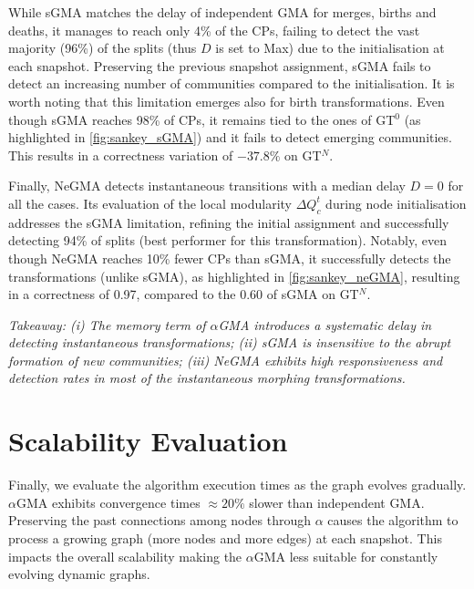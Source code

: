 \documentclass[letterpaper]{article}
\begin{document}
While sGMA matches the delay of independent GMA for merges, births and deaths, it manages to reach only 4\% of the CPs, failing to detect the vast majority (96\%) of the splits (thus $D$ is set to Max) due to the initialisation at each snapshot. Preserving the previous snapshot assignment, sGMA fails to detect an increasing number of communities compared to the initialisation.
It is worth noting that this limitation emerges also for birth transformations. Even though sGMA reaches 98\% of CPs, it remains tied to the ones of GT$^0$ (as highlighted in \cref{fig:sankey_sGMA}) and it fails to detect emerging communities. This results in a correctness variation of $-37.8\%$ on GT$^N$.

Finally, NeGMA detects instantaneous transitions with a median delay $D=0$ for all the cases. Its evaluation of the local modularity $\Delta Q^t_c$ during node initialisation addresses the sGMA limitation, refining the initial assignment and successfully detecting 94\% of splits (best performer for this transformation). Notably, even though NeGMA reaches 10\% fewer CPs than sGMA, it successfully detects the transformations (unlike sGMA), as highlighted in \cref{fig:sankey_neGMA}, resulting in a correctness of 0.97, compared to the 0.60 of sGMA on GT$^N$.

\emph{Takeaway: (i) The memory term of $\alpha$GMA introduces a systematic delay in detecting instantaneous transformations; (ii) sGMA is insensitive to the abrupt formation of new communities; (iii) NeGMA exhibits high responsiveness and detection rates in most of the instantaneous morphing transformations.}

\section{Scalability Evaluation}
\label{ss:runtime}

Finally, we evaluate the algorithm execution times as the graph evolves gradually. $\alpha$GMA exhibits convergence times $\approx 20\%$ slower than independent GMA. Preserving the past connections among nodes through $\alpha$ causes the algorithm to process a growing graph (more nodes and more edges) at each snapshot. This impacts the overall scalability making the $\alpha$GMA less suitable for constantly evolving dynamic graphs.
\end{document}
